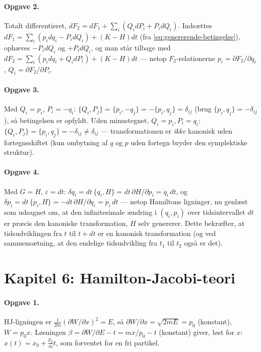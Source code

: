 \paragraph{Opgave 2.} Totalt differentieret, $dF_2=dF_1+\sum_i(Q_idP_i+P_idQ_i)$.
Indsættes $dF_1=\sum_i(p_idq_i-P_idQ_i)+(K-H)dt$ (fra
\eqref{eq:genererende-betingelse}), ophæves $-P_idQ_i$ og $+P_idQ_i$,
og man står tilbage med $dF_2=\sum_i(p_idq_i+Q_idP_i)+(K-H)dt$ —
netop $F_2$-relationerne $p_i=\partial F_2/\partial q_i$,
$Q_i=\partial F_2/\partial P_i$.

\paragraph{Opgave 3.} Med $Q_i=p_i$, $P_i=-q_i$:
$\{Q_i,P_j\}=\{p_i,-q_j\}=-\{p_i,q_j\}=\delta_{ij}$ (brug
$\{p_i,q_j\}=-\delta_{ij}$), så betingelsen er opfyldt. Uden
minustegnet, $Q_i=p_i,P_i=q_i$: $\{Q_i,P_j\}=\{p_i,q_j\}=-\delta_{ij}\neq\delta_{ij}$
— transformationen er \emph{ikke} kanonisk uden fortegnsskiftet
(kun ombytning af $q$ og $p$ uden fortegn bryder den symplektiske
struktur).

\paragraph{Opgave 4.} Med $G=H$, $\varepsilon=dt$:
$\delta q_i=dt\,\{q_i,H\}=dt\,\partial H/\partial p_i=\dot q_i\,dt$,
og $\delta p_i=dt\,\{p_i,H\}=-dt\,\partial H/\partial q_i=\dot p_i\,dt$
— netop Hamiltons ligninger, nu genlæst som udsagnet om, at den
infinitesimale ændring i $(q_i,p_i)$ over tidsintervallet $dt$ er
præcis den kanoniske transformation, $H$ selv genererer. Dette
bekræfter, at tidsudviklingen fra $t$ til $t+dt$ er en kanonisk
transformation (og ved sammensætning, at den endelige tidsudvikling
fra $t_1$ til $t_2$ også er det).

\section*{Kapitel 6: Hamilton-Jacobi-teori}

\paragraph{Opgave 1.} HJ-ligningen er
$\frac{1}{2m}(\partial W/\partial x)^2=E$, så
$\partial W/\partial x=\sqrt{2mE}=p_0$ (konstant), $W=p_0x$. Løsningen
$\beta=\partial W/\partial E-t=mx/p_0-t$ (konstant) giver, løst for
$x$: $x(t)=x_0+\frac{p_0}{m}t$, som forventet for en fri partikel.

